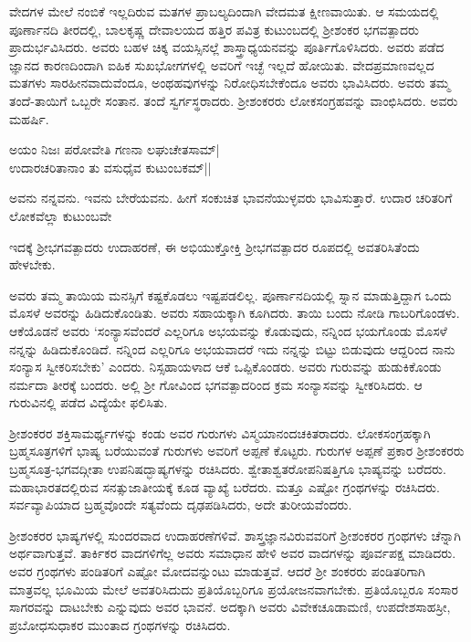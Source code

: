 ವೇದಗಳ ಮೇಲೆ ನಂಬಿಕೆ ಇಲ್ಲದಿರುವ ಮತಗಳ ಪ್ರಾಬಲ್ಯದಿಂದಾಗಿ ವೇದಮತ ಕ್ಷೀಣವಾಯಿತು. ಆ ಸಮಯದಲ್ಲಿ ಪೂರ್ಣಾನದಿ ತೀರದಲ್ಲಿ, ಬಾಲಕೃಷ್ಣ ದೇವಾಲಯದ ಹತ್ತಿರ ಪವಿತ್ರ ಕುಟುಂಬದಲ್ಲಿ ಶ್ರೀಶಂಕರ ಭಗವತ್ಪಾದರು ಪ್ರಾದುರ್ಭವಿಸಿದರು. ಅವರು ಬಹಳ ಚಿಕ್ಕ ವಯಸ್ಸಿನಲ್ಲೆ ಶಾಸ್ತ್ರಾಧ್ಯಯನವನ್ನು ಪೂರ್ತಿಗೊಳಿಸಿದರು. ಅವರು ಪಡೆದ ಜ್ಞಾನದ ಕಾರಣದಿಂದಾಗಿ ಐಹಿಕ ಸುಖಭೋಗಗಳಲ್ಲಿ ಅವರಿಗೆ ಇಚ್ಛೆ ಇಲ್ಲದೆ ಹೋಯಿತು. ವೇದಪ್ರಮಾಣವಲ್ಲದ ಮತಗಳು ಸಾರಹೀನವಾದುವೆಂದೂ, ಅಂಥಹವುಗಳನ್ನು ನಿರೋಧಿಸಬೇಕೆಂದೂ ಅವರು ಭಾವಿಸಿದರು. ಅವರು ತಮ್ಮ ತಂದೆ-ತಾಯಿಗೆ ಒಬ್ಬರೇ ಸಂತಾನ. ತಂದೆ ಸ್ವರ್ಗಸ್ಥರಾದರು. ಶ್ರೀಶಂಕರರು ಲೋಕಸಂಗ್ರಹವನ್ನು ವಾಂಛಿಸಿದರು. ಅವರು ಮಹರ್ಷಿ.

\begin{shloka}
ಅಯಂ ನಿಜಃ ಪರೋವೇತಿ ಗಣನಾ ಲಘುಚೇತಸಾಮ್|\\
ಉದಾರಚರಿತಾನಾಂ ತು ವಸುಧೈವ ಕುಟುಂಬಕಮ್||
\end{shloka}

ಅವನು ನನ್ನವನು. ಇವನು ಬೇರೆಯವನು. ಹೀಗೆ ಸಂಕುಚಿತ ಭಾವನೆಯುಳ್ಳವರು ಭಾವಿಸುತ್ತಾರೆ. ಉದಾರ ಚರಿತರಿಗೆ ಲೋಕವೆಲ್ಲಾ ಕುಟುಂಬವೇ

ಇದಕ್ಕೆ ಶ್ರೀಭಗವತ್ಪಾದರು ಉದಾಹರಣೆ, ಈ ಅಭಿಯುಕ್ತೋಕ್ತಿ ಶ್ರೀಭಗವತ್ಪಾದರ ರೂಪದಲ್ಲಿ ಅವತರಿಸಿತೆಂದು ಹೇಳಬೇಕು.

ಅವರು ತಮ್ಮ ತಾಯಿಯ ಮನಸ್ಸಿಗೆ ಕಷ್ಟಕೊಡಲು ಇಷ್ಟಪಡಲಿಲ್ಲ. ಪೂರ್ಣಾನದಿಯಲ್ಲಿ ಸ್ನಾನ ಮಾಡುತ್ತಿದ್ದಾಗ ಒಂದು ಮೊಸಳೆ ಅವರನ್ನು ಹಿಡಿದುಕೊಂಡಿತು. ಅವರು ಸಹಾಯಕ್ಕಾಗಿ ಕೂಗಿದರು. ತಾಯಿ ಬಂದು ನೋಡಿ ಗಾಬರಿಗೊಂಡಳು. ಆಕೆಯೊಡನೆ ಅವರು `ಸಂನ್ಯಾಸವೆಂದರೆ ಎಲ್ಲರಿಗೂ ಅಭಯವನ್ನು ಕೊಡುವುದು, ನನ್ನಿಂದ ಭಯಗೊಂಡು ಮೊಸಳೆ ನನ್ನನ್ನು ಹಿಡಿದುಕೊಂಡಿದೆ. ನನ್ನಿಂದ ಎಲ್ಲರಿಗೂ ಅಭಯವಾದರೆ ಇದು ನನ್ನನ್ನು ಬಿಟ್ಟು ಬಿಡುವುದು ಆದ್ದರಿಂದ ನಾನು ಸಂನ್ಯಾಸ ಸ್ವೀಕರಿಸಬೇಕು' ಎಂದರು. ನಿಸ್ಸಹಾಯಳಾದ ಆಕೆ ಒಪ್ಪಿಕೊಂಡರು. ಅವರು ಗುರುವನ್ನು ಹುಡುಕಿಕೊಂಡು ನರ್ಮದಾ ತೀರಕ್ಕೆ ಬಂದರು. ಅಲ್ಲಿ ಶ್ರೀ ಗೋವಿಂದ ಭಗವತ್ಪಾದರಿಂದ ಕ್ರಮ ಸಂನ್ಯಾಸವನ್ನು ಸ್ವೀಕರಿಸಿದರು. ಆ ಗುರುವಿನಲ್ಲಿ ಪಡೆದ ವಿದ್ಯೆಯೇ ಫಲಿಸಿತು.

ಶ್ರೀಶಂಕರರ ಶಕ್ತಿಸಾಮರ್ಥ್ಯಗಳನ್ನು ಕಂಡು ಅವರ ಗುರುಗಳು ವಿಸ್ಮಯಾನಂದಚಕಿತರಾದರು. ಲೋಕಸಂಗ್ರಹಕ್ಕಾಗಿ ಬ್ರಹ್ಮಸೂತ್ರಗಳಿಗೆ ಭಾಷ್ಯ ಬರೆಯುವಂತೆ ಗುರುಗಳು ಅವರಿಗೆ ಅಪ್ಪಣೆ ಕೊಟ್ಟರು. ಗುರುಗಳ ಅಪ್ಪಣೆ ಪ್ರಕಾರ ಶ್ರೀಶಂಕರರು ಬ್ರಹ್ಮಸೂತ್ರ-ಭಗವದ್ಗೀತಾ ಉಪನಿಷದ್ಭಾಷ್ಯಗಳನ್ನು ರಚಿಸಿದರು. ಶ್ವೇತಾಶ್ವತರೋಪನಿಷತ್ತಿಗೂ ಭಾಷ್ಯವನ್ನು ಬರೆದರು. ಮಹಾಭಾರತದಲ್ಲಿರುವ ಸನತ್ಸುಜಾತೀಯಕ್ಕೆ ಕೂಡ ವ್ಯಾಖ್ಯೆ ಬರೆದರು. ಮತ್ತೂ ಎಷ್ಟೋ ಗ್ರಂಥಗಳನ್ನು ರಚಿಸಿದರು. ಸರ್ವವ್ಯಾಪಿಯಾದ ಬ್ರಹ್ಮವೊಂದೇ ಸತ್ಯವೆಂದು ದೃಢಪಡಿಸಿದರು, ಅದೇ ತುರೀಯವೆಂದರು.

ಶ್ರೀಶಂಕರರ ಭಾಷ್ಯಗಳಲ್ಲಿ ಸುಂದರವಾದ ಉದಾಹರಣೆಗಳಿವೆ. ಶಾಸ್ತ್ರಜ್ಞಾನವಿರುವವರಿಗೆ ಶ್ರೀಶಂಕರರ ಗ್ರಂಥಗಳು ಚೆನ್ನಾಗಿ ಅರ್ಥವಾಗುತ್ತವೆ. ತಾರ್ಕಿಕರ ವಾದಗಳಿಗೆಲ್ಲ ಅವರು ಸಮಾಧಾನ ಹೇಳಿ ಅವರ ವಾದಗಳನ್ನು ಪೂರ್ವಪಕ್ಷ ಮಾಡಿದರು. ಅವರ ಗ್ರಂಥಗಳು ಪಂಡಿತರಿಗೆ ಎಷ್ಟೋ ಮೋದವನ್ನುಂಟು ಮಾಡುತ್ತವೆ. ಆದರೆ ಶ್ರೀ ಶಂಕರರು ಪಂಡಿತರಿಗಾಗಿ ಮಾತ್ರವಲ್ಲ ಭೂಮಿಯ ಮೇಲೆ ಅವತರಿಸಿದುದು ಪ್ರತಿಯೊಬ್ಬರಿಗೂ ಪ್ರಯೋಜನವಾಗಬೇಕು. ಪ್ರತಿಯೊಬ್ಬರೂ ಸಂಸಾರ ಸಾಗರವನ್ನು ದಾಟಬೇಕು ಎನ್ನುವುದು ಅವರ ಭಾವನೆ. ಅದಕ್ಕಾಗಿ ಅವರು ವಿವೇಕಚೂಡಾಮಣಿ, ಉಪದೇಶಸಾಹಸ್ರೀ, ಪ್ರಬೋಧಸುಧಾಕರ ಮುಂತಾದ ಗ್ರಂಥಗಳನ್ನು ರಚಿಸಿದರು.

